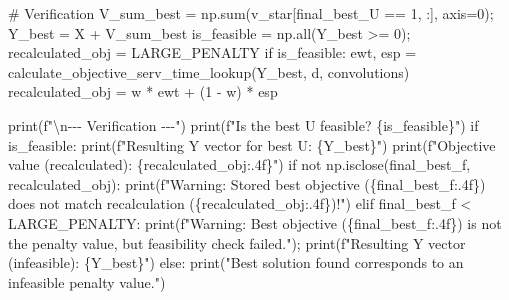 \documentclass[
  letterpaper,
  DIV=11,
  numbers=noendperiod]{scrartcl}
\newenvironment{Shaded}{\begin{snugshade}}{\end{snugshade}}
\newcommand{\BuiltInTok}[1]{\textcolor[rgb]{0.00,0.23,0.31}{#1}}
\newcommand{\CharTok}[1]{\textcolor[rgb]{0.13,0.47,0.30}{#1}}
\newcommand{\CommentTok}[1]{\textcolor[rgb]{0.37,0.37,0.37}{#1}}
\newcommand{\ControlFlowTok}[1]{\textcolor[rgb]{0.00,0.23,0.31}{#1}}
\newcommand{\DecValTok}[1]{\textcolor[rgb]{0.68,0.00,0.00}{#1}}
\newcommand{\KeywordTok}[1]{\textcolor[rgb]{0.00,0.23,0.31}{#1}}
\newcommand{\NormalTok}[1]{\textcolor[rgb]{0.00,0.23,0.31}{#1}}
\newcommand{\OperatorTok}[1]{\textcolor[rgb]{0.37,0.37,0.37}{#1}}
\newcommand{\SpecialCharTok}[1]{\textcolor[rgb]{0.37,0.37,0.37}{#1}}
\newcommand{\SpecialStringTok}[1]{\textcolor[rgb]{0.13,0.47,0.30}{#1}}
\newcommand{\StringTok}[1]{\textcolor[rgb]{0.13,0.47,0.30}{#1}}
\begin{document}
\begin{Shaded}
\begin{Highlighting}[]
    \CommentTok{\# Verification}
\NormalTok{    V\_sum\_best }\OperatorTok{=}\NormalTok{ np.}\BuiltInTok{sum}\NormalTok{(v\_star[final\_best\_U }\OperatorTok{==} \DecValTok{1}\NormalTok{, :], axis}\OperatorTok{=}\DecValTok{0}\NormalTok{)}\OperatorTok{;}\NormalTok{ Y\_best }\OperatorTok{=}\NormalTok{ X }\OperatorTok{+}\NormalTok{ V\_sum\_best}
\NormalTok{    is\_feasible }\OperatorTok{=}\NormalTok{ np.}\BuiltInTok{all}\NormalTok{(Y\_best }\OperatorTok{\textgreater{}=} \DecValTok{0}\NormalTok{)}\OperatorTok{;}\NormalTok{ recalculated\_obj }\OperatorTok{=}\NormalTok{ LARGE\_PENALTY}
    \ControlFlowTok{if}\NormalTok{ is\_feasible:}
\NormalTok{        ewt, esp }\OperatorTok{=}\NormalTok{ calculate\_objective\_serv\_time\_lookup(Y\_best, d, convolutions)}
\NormalTok{        recalculated\_obj }\OperatorTok{=}\NormalTok{ w }\OperatorTok{*}\NormalTok{ ewt }\OperatorTok{+}\NormalTok{ (}\DecValTok{1} \OperatorTok{{-}}\NormalTok{ w) }\OperatorTok{*}\NormalTok{ esp}

    \BuiltInTok{print}\NormalTok{(}\SpecialStringTok{f"}\CharTok{\textbackslash{}n}\SpecialStringTok{{-}{-}{-} Verification {-}{-}{-}"}\NormalTok{)}
    \BuiltInTok{print}\NormalTok{(}\SpecialStringTok{f"Is the best U feasible? }\SpecialCharTok{\{}\NormalTok{is\_feasible}\SpecialCharTok{\}}\SpecialStringTok{"}\NormalTok{)}
    \ControlFlowTok{if}\NormalTok{ is\_feasible:}
        \BuiltInTok{print}\NormalTok{(}\SpecialStringTok{f"Resulting Y vector for best U: }\SpecialCharTok{\{}\NormalTok{Y\_best}\SpecialCharTok{\}}\SpecialStringTok{"}\NormalTok{)}
        \BuiltInTok{print}\NormalTok{(}\SpecialStringTok{f"Objective value (recalculated): }\SpecialCharTok{\{}\NormalTok{recalculated\_obj}\SpecialCharTok{:.4f\}}\SpecialStringTok{"}\NormalTok{)}
        \ControlFlowTok{if} \KeywordTok{not}\NormalTok{ np.isclose(final\_best\_f, recalculated\_obj): }\BuiltInTok{print}\NormalTok{(}\SpecialStringTok{f"Warning: Stored best objective (}\SpecialCharTok{\{}\NormalTok{final\_best\_f}\SpecialCharTok{:.4f\}}\SpecialStringTok{) does not match recalculation (}\SpecialCharTok{\{}\NormalTok{recalculated\_obj}\SpecialCharTok{:.4f\}}\SpecialStringTok{)!"}\NormalTok{)}
    \ControlFlowTok{elif}\NormalTok{ final\_best\_f }\OperatorTok{\textless{}}\NormalTok{ LARGE\_PENALTY: }\BuiltInTok{print}\NormalTok{(}\SpecialStringTok{f"Warning: Best objective (}\SpecialCharTok{\{}\NormalTok{final\_best\_f}\SpecialCharTok{:.4f\}}\SpecialStringTok{) is not the penalty value, but feasibility check failed."}\NormalTok{)}\OperatorTok{;} \BuiltInTok{print}\NormalTok{(}\SpecialStringTok{f"Resulting Y vector (infeasible): }\SpecialCharTok{\{}\NormalTok{Y\_best}\SpecialCharTok{\}}\SpecialStringTok{"}\NormalTok{)}
    \ControlFlowTok{else}\NormalTok{: }\BuiltInTok{print}\NormalTok{(}\StringTok{"Best solution found corresponds to an infeasible penalty value."}\NormalTok{)}
\end{Highlighting}
\end{Shaded}
\end{document}
